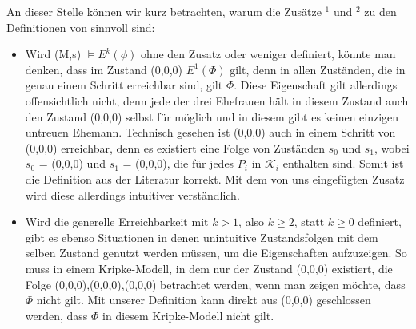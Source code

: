 An dieser Stelle können wir kurz betrachten, warum die Zusätze $^1$ und $^2$ zu den Definitionen von \cite{kshemkalyani2011distributed} sinnvoll sind:
\begin{itemize}
	\item Wird (M,s) $\vDash E^{k}(\phi)$ ohne den Zusatz \glqq oder weniger\grqq{} definiert, könnte man denken, dass im Zustand (0,0,0) $E^1(\Phi)$ gilt, denn in allen Zuständen, die in genau einem Schritt erreichbar sind, gilt $\Phi$. Diese Eigenschaft gilt allerdings offensichtlich nicht, denn jede der drei Ehefrauen hält in diesem Zustand auch den Zustand (0,0,0) selbst für möglich und in diesem gibt es keinen einzigen untreuen Ehemann.
	Technisch gesehen ist (0,0,0) auch in einem Schritt von (0,0,0) erreichbar, denn es existiert eine Folge von Zuständen $s_0$ und $s_1$, wobei $s_0$ = (0,0,0) und $s_1$ = (0,0,0), die für jedes $P_i$ in $\mathcal{K}_i$ enthalten sind.
	Somit ist die Definition aus der Literatur korrekt. Mit dem von uns eingefügten Zusatz wird diese allerdings intuitiver verständlich.
	\item Wird die generelle Erreichbarkeit mit $k > 1$, also $k \ge 2$, statt $k \ge 0$ definiert, gibt es ebenso Situationen in denen unintuitive Zustandsfolgen mit dem selben Zustand genutzt werden müssen, um die Eigenschaften aufzuzeigen.
	So muss in einem Kripke-Modell, in dem nur der Zustand (0,0,0) existiert, die Folge (0,0,0),(0,0,0),(0,0,0) betrachtet werden, wenn man zeigen möchte, dass $\Phi$ nicht gilt. Mit unserer Definition kann direkt aus (0,0,0) geschlossen werden, dass $\Phi$ in diesem Kripke-Modell nicht gilt.
\end{itemize}